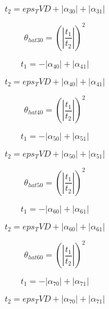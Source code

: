 \documentclass{article}
\begin{document}
\begin{dmath}t_{2} = eps_TVD + \left|{\alpha_{30}}\right| + \left|{\alpha_{31}}\right|\end{dmath}

\begin{dmath}\theta_{hat 30} = \left(\left|{\frac{t_{1}}{t_{2}}}\right| \right)^{2}\end{dmath}

\begin{dmath}t_{1} = - \left|{\alpha_{40}}\right| + \left|{\alpha_{41}}\right|\end{dmath}

\begin{dmath}t_{2} = eps_TVD + \left|{\alpha_{40}}\right| + \left|{\alpha_{41}}\right|\end{dmath}

\begin{dmath}\theta_{hat 40} = \left(\left|{\frac{t_{1}}{t_{2}}}\right| \right)^{2}\end{dmath}

\begin{dmath}t_{1} = - \left|{\alpha_{50}}\right| + \left|{\alpha_{51}}\right|\end{dmath}

\begin{dmath}t_{2} = eps_TVD + \left|{\alpha_{50}}\right| + \left|{\alpha_{51}}\right|\end{dmath}

\begin{dmath}\theta_{hat 50} = \left(\left|{\frac{t_{1}}{t_{2}}}\right| \right)^{2}\end{dmath}

\begin{dmath}t_{1} = - \left|{\alpha_{60}}\right| + \left|{\alpha_{61}}\right|\end{dmath}

\begin{dmath}t_{2} = eps_TVD + \left|{\alpha_{60}}\right| + \left|{\alpha_{61}}\right|\end{dmath}

\begin{dmath}\theta_{hat 60} = \left(\left|{\frac{t_{1}}{t_{2}}}\right| \right)^{2}\end{dmath}

\begin{dmath}t_{1} = - \left|{\alpha_{70}}\right| + \left|{\alpha_{71}}\right|\end{dmath}

\begin{dmath}t_{2} = eps_TVD + \left|{\alpha_{70}}\right| + \left|{\alpha_{71}}\right|\end{dmath}
\end{document}
